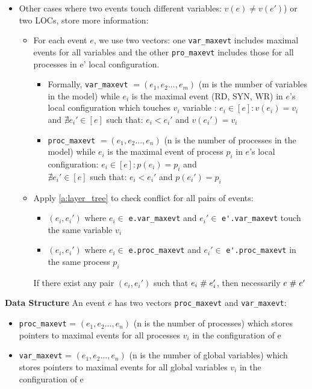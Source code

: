 \documentclass{llncs}
\begin{document}
\begin{enumerate}
\begin{itemize}
			\item Other cases where two events touch different variables: $v(e) \neq v(e')$) or two LOCs, store more information:	
			\begin{itemize}
				\item 
					For each event $e$, we use two vectors: one \verb!var_maxevt! includes maximal events  
					for all variables and 
					the other \verb!pro_maxevt! includes those for all processes in e' local configuration.
					\begin{itemize}
					\item
						Formally, \verb!var_maxevt! $ = (e_1, e_2...,e_m)$  (m is the number of variables in 
						the model)
						while $e_i$ is the maximal event (RD, SYN, WR) in $e$'s local configuration which 
						touches $v_i$ variable :
						$e_i \in  \left[ e \right]: v(e_i) = v_i$ and $ \nexists e_i' \in \left[ e \right] $ 
						such that:
						$e_i < e_i'$ and $v(e_i') = v_i$ 
					\item
						\verb!proc_maxevt! $ = (e_1, e_2...,e_n)$  (n is the number of processes in the
						 model)
						while $e_i$ is the maximal event of process $p_i$ in $e$'s local configuration:
						$e_i \in  \left[ e \right]: p(e_i) = p_i$ and \\
						$ \nexists e_i' \in \left[ e \right] $ such that:
						$e_i < e_i'$ and $p(e_i') = p_i$ 
					\end{itemize}				
				\item
					Apply \cref{a:layer_tree} to check conflict for all pairs of events:
					\begin{itemize}
						\item
							$(e_i, e_i')$ where $e_i \in $ \verb!e.var_maxevt! 	
							and $e_i'\in $ \verb!e'.var_maxevt! touch the same variable $v_i$
						\item
							$(e_i, e_i')$ where $e_i \in $ \verb!e.proc_maxevt! 	
							and $e_i'\in $ \verb!e'.proc_maxevt! in the same process $p_i$
					\end{itemize}
					
					If there exist any pair $(e_i, e_i')$ such that $e_i \mathrel{\#} e_i'$, then necessarily $e \mathrel{\#} e'$			
			\end{itemize}	
		\end{itemize}
\end{enumerate}

\noindent
\textbf{Data Structure}
An event $e$ has two vectors \verb!proc_maxevt! and \verb!var_maxevt!:
\begin{itemize}
	\item
		\verb!proc_maxevt! = $(e_1, e_2...,e_n)$ (n is the number of processes)
		which stores pointers to maximal events for all processes $v_i$ in the configuration of e
	\item
		\verb!var_maxevt! = $(e_1, e_2...,e_n)$ (n is the number of global variables)
		which stores pointers to maximal events for all global variables $v_i$ in the configuration of e	
\end{itemize}
\end{document}
